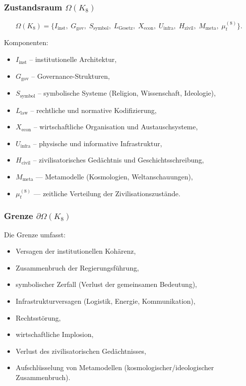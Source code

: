 \subsubsection{Zustandsraum \texorpdfstring{$\Omega(K_8)$}{\Omega(K_8)}}

\[
\Omega(K_8)=
\{
I_{\mathrm{inst}},\;
G_{\mathrm{gov}},\;
S_{\mathrm{symbol}},\;
L_{\mathrm{Gesetz}},\;
X_{\mathrm{econ}},\;
U_{\mathrm{infra}},\;
H_{\mathrm{zivil}},\;
M_{\mathrm{meta}},\;
\mu^{(8)}_t
\}.
\]

Komponenten:
\begin{itemize}
    \item $I_{\mathrm{inst}}$ – institutionelle Architektur,
    \item $G_{\mathrm{gov}}$ – Governance-Strukturen,
    \item $S_{\mathrm{symbol}}$ – symbolische Systeme (Religion, Wissenschaft, Ideologie),
    \item $L_{\mathrm{law}}$ – rechtliche und normative Kodifizierung,
    \item $X_{\mathrm{econ}}$ – wirtschaftliche Organisation und Austauschsysteme,
    \item $U_{\mathrm{infra}}$ – physische und informative Infrastruktur,
    \item $H_{\mathrm{civil}}$ – zivilisatorisches Gedächtnis und Geschichtsschreibung,
    \item $M_{\mathrm{meta}}$ — Metamodelle (Kosmologien, Weltanschauungen),
    \item $\mu^{(8)}_t$ — zeitliche Verteilung der Zivilisationszustände.
\end{itemize}

\subsubsection{Grenze \texorpdfstring{$\partial\Omega(K_8)$}{\partial\Omega(K_8)}}

Die Grenze umfasst:
\begin{itemize}
    \item Versagen der institutionellen Kohärenz,
    \item Zusammenbruch der Regierungsführung,
    \item symbolischer Zerfall (Verlust der gemeinsamen Bedeutung),
    \item Infrastrukturversagen (Logistik, Energie, Kommunikation),
    \item Rechtsstörung,
    \item wirtschaftliche Implosion,
    \item Verlust des zivilisatorischen Gedächtnisses,
    \item Aufschlüsselung von Metamodellen (kosmologischer/ideologischer Zusammenbruch).
\end{itemize}

